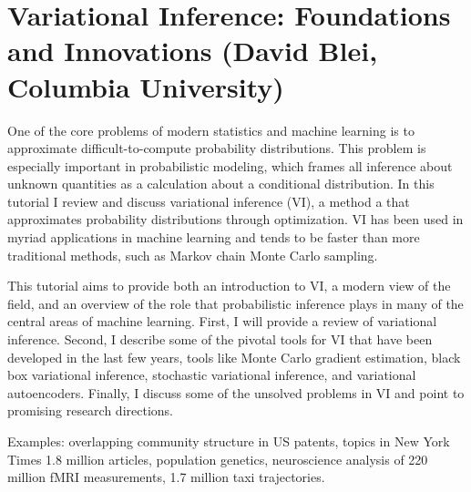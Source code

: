 \section{Variational Inference: Foundations and Innovations (David Blei, Columbia University)}


One of the core problems of modern statistics and machine learning is to approximate difficult-to-compute probability distributions. This problem is especially important in probabilistic modeling, which frames all inference about unknown quantities as a calculation about a conditional distribution. In this tutorial I review and discuss variational inference (VI), a method a that approximates probability distributions through optimization. VI has been used in myriad applications in machine learning and tends to be faster than more traditional methods, such as Markov chain Monte Carlo sampling.
 
This tutorial aims to provide both an introduction to VI, a modern view of the field, and an overview of the role that probabilistic inference plays in many of the central areas of machine learning. First, I will provide a review of variational inference. Second, I describe some of the pivotal tools for VI that have been developed in the last few years, tools like Monte Carlo gradient estimation, black box variational inference, stochastic variational inference, and variational autoencoders. Finally, I discuss some of the unsolved problems in VI and point to promising research directions.


Examples: overlapping community structure in US patents, topics in New York Times 1.8 million articles, population genetics, neuroscience analysis of 220 million fMRI measurements, 1.7 million taxi trajectories.

